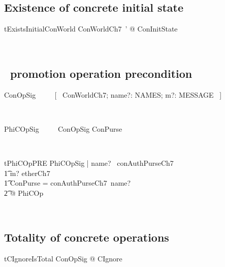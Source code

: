 \subsection{Existence of concrete initial state}\label{ch8.specproof-con-init}

\begin{LThm}
\begin{theorem}{tExistsInitialConWorld}
     \exists ConWorldCh7~' @ ConInitState
\end{theorem}~\end{LThm}

\subsection{\Conc\ promotion operation precondition}\label{ch8.conc.promotionschema}

\begin{LNewSDef}
\begin{zed}
   ConOpSig ~~~~ [~ ConWorldCh7; name?: NAMES; m?: MESSAGE ~]
\end{zed}~\end{LNewSDef}

\begin{LNewSDef}
\begin{zed}
   PhiCOpSig ~~~~ ConOpSig \land ConPurse
\end{zed}~\end{LNewSDef}

\begin{LNewThm}
\begin{theorem}{tPhiCOpPRE}
    \forall PhiCOpSig | name? \in \dom~conAuthPurseCh7 \\
        \t1 \land m? \in etherCh7 \land \\
        \t1 \theta  ConPurse = conAuthPurseCh7~name? \\
            \t2 @ \pre PhiCOp
\end{theorem}~\end{LNewThm}

\subsection{Totality of concrete operations}\label{ch8.specproof-con-total}

\begin{LNewThm}
\begin{theorem}{tCIgnoreIsTotal}
    \forall ConOpSig @ \pre CIgnore
\end{theorem}~\end{LNewThm}

